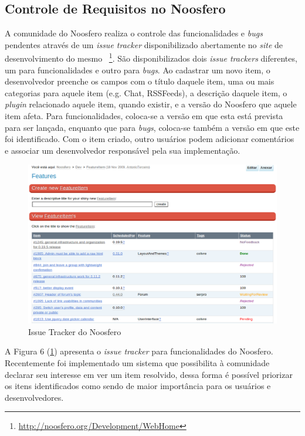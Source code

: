 \subsection{Controle de Requisitos no Noosfero}

A comunidade do Noosfero realiza o controle das funcionalidades e \textit{bugs}
pendentes através de um \textit{issue tracker} disponibilizado abertamente no
\textit{site} de desenvolvimento do mesmo
~\footnote{\url{http://noosfero.org/Development/WebHome}}. São disponibilizados
dois \textit{issue trackers} diferentes, um para funcionalidades e outro para
\textit{bugs}. Ao cadastrar um novo item, o desenvolvedor preenche os campos
com o título daquele item, uma ou mais categorias para aquele item (e.g. Chat,
RSSFeeds), a descrição daquele item, o \textit{plugin} relacionado aquele item,
quando existir, e a versão do Noosfero que aquele item afeta. Para funcionalidades,
coloca-se a versão em que esta está prevista para ser lançada, enquanto que para
\textit{bugs}, coloca-se também a versão em que este foi identificado. Com o item
criado, outro usuários podem adicionar comentários e associar um desenvolvedor
responsável pela sua implementação.

\begin{figure}[h]
	\centering
	\label{issue-tracker}
		\includegraphics[keepaspectratio=true,scale=0.4]
		{figuras/issue-tracker.eps}
	\caption{Issue Tracker do Noosfero}
\end{figure}

A Figura 6 (\ref{issue-tracker}) apresenta o \textit{issue tracker} para
funcionalidades do Noosfero.
%
Recentemente foi implementado um sistema que possibilita à comunidade declarar
seu interesse em ver um item resolvido, dessa forma é possível priorizar os
itens identificados como sendo de maior importância para os usuários e
desenvolvedores.

